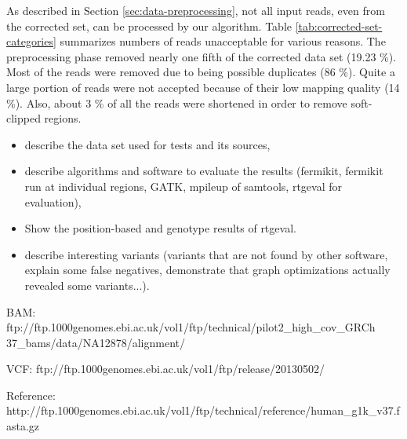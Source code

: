 As described in Section \ref{sec:data-preprocessing}, not all input reads, even from the corrected set, can be processed by our algorithm. Table \ref{tab:corrected-set-categories} summarizes numbers of reads unacceptable for various reasons. The preprocessing phase removed nearly one fifth of the corrected data set (19.23 \%). Most of the reads were removed due to being possible duplicates (86 \%). Quite a large portion of  reads were not accepted because of their low mapping quality (14 \%). Also, about 3 \% of all the reads were shortened in order to remove soft-clipped regions.

\begin{itemize}
\item describe the data set used for tests and its sources,
\item describe algorithms and software to evaluate the results (fermikit, fermikit run at individual regions, GATK, mpileup of samtools, rtgeval for evaluation),
\item Show the position-based and genotype results of rtgeval.
\item describe interesting variants (variants that are not found by other software, explain some false negatives, demonstrate that graph optimizations actually revealed some variants...).
\end{itemize}

BAM:
ftp://ftp.1000genomes.ebi.ac.uk/vol1/ftp/technical/pilot2_high_cov_GRCh
37_bams/data/NA12878/alignment/

VCF:
ftp://ftp.1000genomes.ebi.ac.uk/vol1/ftp/release/20130502/

Reference:
http://ftp.1000genomes.ebi.ac.uk/vol1/ftp/technical/reference/human_g1k_v37.fasta.gz

